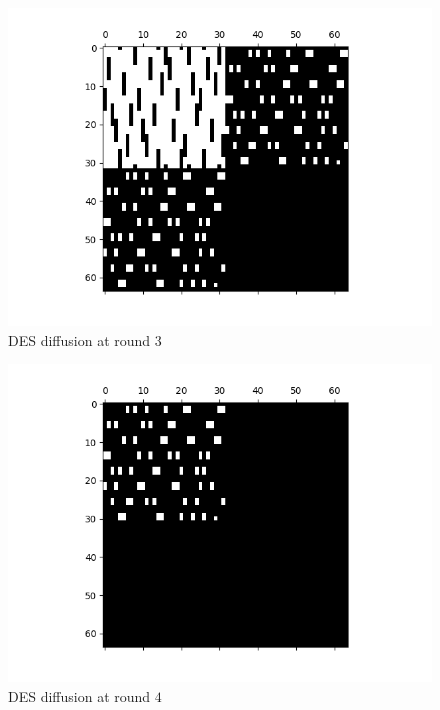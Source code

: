 \documentclass{report}
\begin{document}
\begin{figure}[H]
    \centering
    \includegraphics[scale=0.7]{sparse_des_difusao_iteracao_3.png}
    \caption{DES diffusion at round $3$}
    \label{fig:desdif3}
\end{figure}
\begin{figure}[H]
    \centering
    \includegraphics[scale=0.7]{sparse_des_difusao_iteracao_4.png}
    \caption{DES diffusion at round $4$}
    \label{fig:desdif4}
\end{figure}
\end{document}
